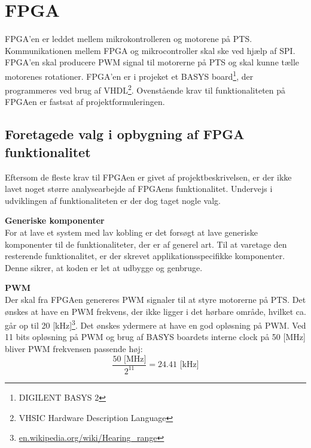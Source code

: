 \section{FPGA}
\label{sec:FPGA}
FPGA'en er leddet mellem mikrokontrolleren og motorene på PTS. 
Kommunikationen mellem FPGA og mikrocontroller skal ske ved hjælp af SPI. 
FPGA'en skal producere PWM signal til motorerne på PTS og skal kunne tælle motorenes rotationer. 
FPGA'en er i projeket et BASYS board\footnote{DIGILENT BASYS 2}, der programmeres ved brug af VHDL\footnote{VHSIC Hardware Description Language}.
Ovenstående krav til funktionaliteten på FPGAen er fastsat af 
projektformuleringen.

\subsection{Foretagede valg i opbygning af FPGA funktionalitet}
Eftersom de fleste krav til FPGAen er givet af projektbeskrivelsen, er der ikke 
lavet noget større analysearbejde af FPGAens funktionalitet. Undervejs i 
udviklingen af funktionaliteten er der dog taget nogle valg.

\textbf{Generiske komponenter}\\
For at lave et system med lav kobling er det forsøgt at lave 
generiske komponenter til de funktionaliteter, der er af generel art. 
Til at varetage den resterende funktionalitet, er der skrevet applikationsspecifikke 
komponenter.
Denne sikrer, at koden er let at udbygge og genbruge.

\textbf{PWM}\\
Der skal fra FPGAen genereres PWM signaler til at styre motorerne på PTS.
Det ønskes at have en PWM frekvens, der ikke ligger i det hørbare område, hvilket ca. går op til 20 [kHz]\footnote{\url{en.wikipedia.org/wiki/Hearing\_range}}. 
Det ønskes ydermere at have en god opløsning på PWM. 
Ved 11 bits opløsning på PWM og brug af BASYS boardets interne clock på 50 [MHz] bliver PWM frekvensen passende høj:
\begin{equation}
  \frac{50 \text{ [MHz]}}{2^{11}} = 24.41 \text{ [kHz]}
\end{equation}


